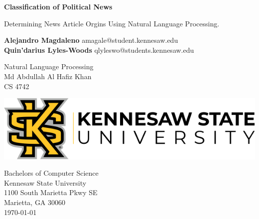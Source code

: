 \begin{titlepage}
\begin{center}

	\Huge
	\textbf{Classification of Political News}

	\vspace{0.5cm}
	\LARGE
	Determining News Article Orgins Using Natural Language Processing.	

	\vspace{1.5cm}

	\textbf{Alejandro Magdaleno}
	\Large
	amagale@student.kennesaw.edu	\\
	\vspace{.5cm}
	\LARGE
	\textbf{Quin'darius Lyles-Woods}
	\Large
	qlyleswo@students.kennesaw.edu

	\vfill
	\LARGE
	Natural Language Processing     	\\
	Md Abdullah Al Hafiz Khan 		\\
	CS 4742
	\vspace{0.8cm}

	\includegraphics[width=\textwidth]{kennesawlogo}

	\vspace{0.8cm}

	\Large
	Bachelors of Computer Science\\
	Kennesaw State University\\
	1100 South Marietta Pkwy SE\\
	Marietta, GA 30060\\
	\today	

	\vspace{1cm}

\end{center}
\end{titlepage}
